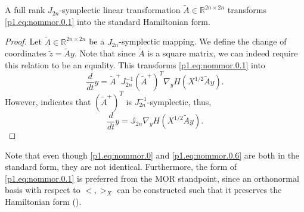 \begin{lemma}%
A full rank $J_{2n}$-symplectic linear transformation $\tilde A \in \mathbb R^{2n\times 2n}$ transforms \eqref{p1.eq:nommor.0.1} into the standard Hamiltonian form. 
\end{lemma}

\begin{proof}
Let $\tilde A\in \mathbb R^{2n\times 2n}$ be a $J_{2n}$-symplectic mapping. We define the change of coordinates $\tilde z = \tilde Ay$. Note that since $\tilde A$ is a square matrix, we can indeed require this relation to be an equality. This transforms \eqref{p1.eq:nommor.0.1} into
\begin{equation} \label{p1.eq:nommor.0.5}
	\frac{d}{dt} y = \tilde A^+ J_{2n}^{-1} (\tilde A^+)^T \nabla_y H(X^{1/2}\tilde Ay).
\end{equation}
However,  indicates that $(\tilde A^+)^T$ is $J_{2n}^{-1}$-symplectic, thus,
\begin{equation} \label{p1.eq:nommor.0.6}
	\frac{d}{dt} y = \mathbb J_{2n} \nabla_y H(X^{1/2}\tilde Ay).
\end{equation}
\end{proof}
Note that even though \eqref{p1.eq:nommor.0} and \eqref{p1.eq:nommor.0.6} are both in the standard form, they are not identical. Furthermore, the form of \eqref{p1.eq:nommor.0.1} is preferred from the MOR standpoint, since an orthonormal basis with respect to $<,>_X$ can be constructed such that it preserves the Hamiltonian form ().

